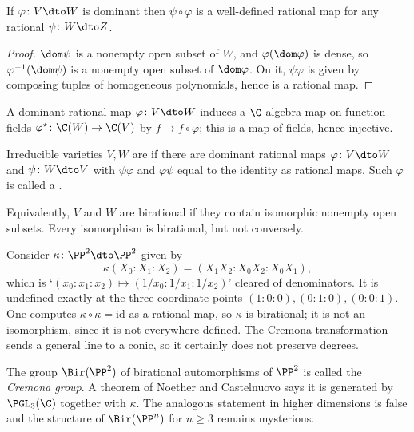 \begin{proposition}
	If $\varphi \colon V \dto W$ is dominant then $\psi \circ \varphi$ is a well-defined rational map for any rational $\psi \colon W \dto Z$.
\end{proposition}

\begin{proof}
	$\dom\psi$ is a nonempty open subset of $W$, and $\varphi(\dom\varphi)$ is dense, so $\varphi^{-1}(\dom\psi)$ is a nonempty open subset of $\dom\varphi$. On it, $\psi\varphi$ is given by composing tuples of homogeneous polynomials, hence is a rational map.
\end{proof}

A dominant rational map $\varphi \colon V \dto W$ induces a $\C$-algebra map on function fields $\varphi^\star \colon \C(W) \to \C(V)$ by $f \mapsto f \circ \varphi$; this is a map of fields, hence injective.

\begin{definition}[Birational]
	Irreducible varieties $V, W$ are  if there are dominant rational maps $\varphi \colon V \dto W$ and $\psi \colon W \dto V$ with $\psi\varphi$ and $\varphi\psi$ equal to the identity as rational maps. Such $\varphi$ is called a .
\end{definition}

Equivalently, $V$ and $W$ are birational if they contain isomorphic nonempty open subsets. Every isomorphism is birational, but not conversely.

\begin{example}
	Consider $\kappa \colon \PP^2 \dto \PP^2$ given by
	$$\kappa(X_0:X_1:X_2) = (X_1X_2 : X_0X_2 : X_0X_1),$$
	which is `$(x_0:x_1:x_2) \mapsto (1/x_0 : 1/x_1 : 1/x_2)$' cleared of denominators. It is undefined exactly at the three coordinate points $(1:0:0), (0:1:0), (0:0:1)$. One computes $\kappa \circ \kappa = \mathrm{id}$ as a rational map, so $\kappa$ is birational; it is not an isomorphism, since it is not everywhere defined. The Cremona transformation sends a general line to a conic, so it certainly does not preserve degrees.
\end{example}

\begin{remark}
	The group $\Bir(\PP^2)$ of birational automorphisms of $\PP^2$ is called the \emph{Cremona group}. A theorem of Noether and Castelnuovo says it is generated by $\PGL_3(\C)$ together with $\kappa$. The analogous statement in higher dimensions is false and the structure of $\Bir(\PP^n)$ for $n \geq 3$ remains mysterious.
\end{remark}

